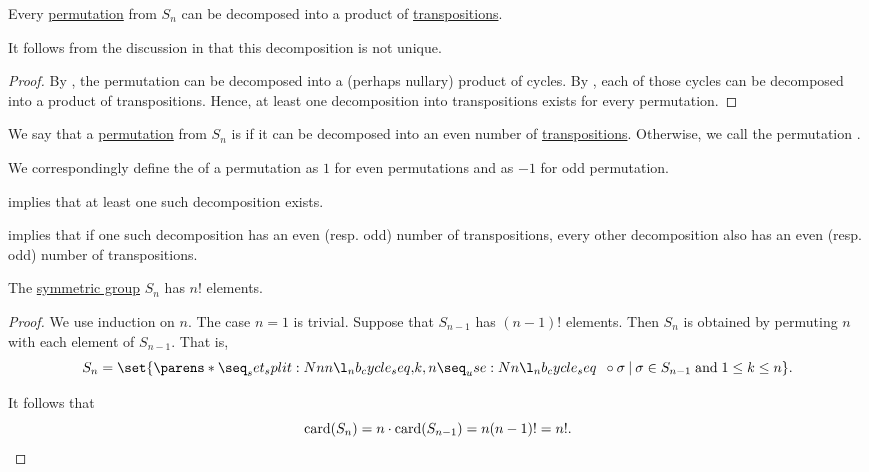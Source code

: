 \begin{proposition}\label{thm:permutation_decomposition_existence}
  Every \hyperref[def:symmetric_group]{permutation} from \( S_n \) can be decomposed into a product of \hyperref[def:cyclic_permutation]{transpositions}.
\end{proposition}
\begin{comments}
  \item It follows from the discussion in  that this decomposition is not unique.
\end{comments}
\begin{proof}
  By , the permutation can be decomposed into a (perhaps nullary) product of cycles. By , each of those cycles can be decomposed into a product of transpositions. Hence, at least one decomposition into transpositions exists for every permutation.
\end{proof}

\begin{definition}\label{def:permutation_parity}\mimprovised
  We say that a \hyperref[def:symmetric_group]{permutation} from \( S_n \) is  if it can be decomposed into an even number of \hyperref[def:cyclic_permutation]{transpositions}. Otherwise, we call the permutation .

  We correspondingly define the  of a permutation as \( 1 \) for even permutations and as \( -1 \) for odd permutation.
\end{definition}
\begin{defproof}
   implies that at least one such decomposition exists.

   implies that if one such decomposition has an even (resp. odd) number of transpositions, every other decomposition also has an even (resp. odd) number of transpositions.
\end{defproof}
\begin{proposition}\label{thm:symmetric_group_cardinality}
  The \hyperref[def:symmetric_group]{symmetric group} \( S_n \) has \( n! \) elements.
\end{proposition}
\begin{proof}
  We use induction on \( n \). The case \( n = 1 \) is trivial. Suppose that \( S_{n-1} \) has \( (n-1)! \) elements. Then \( S_n \) is obtained by permuting \( n \) with each element of \( S_{n-1} \). That is,
  \begin{equation*}
    S_n = \set{ \cycle{ k, n } \bincirc \sigma \given \sigma \in S_{n-1} \T{and} 1 \leq k \leq n }.
  \end{equation*}

  It follows that
  \begin{equation*}
    \operatorname{card}(S_n) = n \cdot \operatorname{card}(S_{n-1}) = n (n-1)! = n!.
  \end{equation*}
\end{proof}

